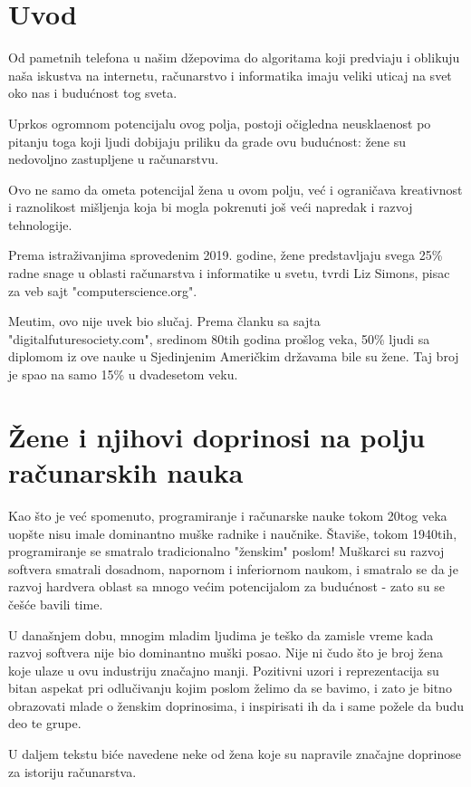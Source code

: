 \documentclass[12pt]{article}
\begin{document}

\tableofcontents

\newpage

\section{Uvod}
\begin{text}
Od pametnih telefona u našim džepovima do algoritama koji predvi\dj aju i oblikuju naša iskustva na internetu, 
računarstvo i informatika imaju veliki uticaj na svet oko nas i budućnost tog sveta.

Uprkos ogromnom potencijalu ovog polja, postoji očigledna neuskla\dj enost po pitanju toga koji ljudi dobijaju priliku da grade ovu budućnost: žene su nedovoljno zastupljene u računarstvu.

Ovo ne samo da ometa potencijal žena u ovom polju, već i ograničava kreativnost i raznolikost mišljenja koja bi mogla pokrenuti još veći napredak i razvoj tehnologije.

Prema istraživanjima sprovedenim 2019. godine, žene predstavljaju svega 25\% radne snage u oblasti računarstva i informatike u svetu, tvrdi Liz Simons, pisac za veb sajt "computerscience.org".

Me\dj utim, ovo nije uvek bio slučaj. Prema članku sa sajta "digitalfuturesociety.com", sredinom 80tih godina prošlog veka, 50\% ljudi sa diplomom iz ove nauke u Sjedinjenim Američkim državama bile su žene. Taj broj je spao na samo 15\% u dvadesetom veku.
\end{text}

\newpage

\section{Žene i njihovi doprinosi na polju računarskih nauka}
\begin{text}
Kao što je već spomenuto, programiranje i računarske nauke tokom 20tog veka uopšte nisu imale dominantno muške radnike i naučnike. Štaviše, tokom 1940tih, programiranje se smatralo tradicionalno "ženskim" poslom! Muškarci su razvoj softvera smatrali dosadnom, napornom i inferiornom naukom, i smatralo se da je razvoj hardvera oblast sa mnogo većim potencijalom za budućnost - zato su se češće bavili time.

U današnjem dobu, mnogim mladim ljudima je teško da zamisle vreme kada razvoj softvera nije bio dominantno muški posao. Nije ni čudo što je broj žena koje ulaze u ovu industriju značajno manji. Pozitivni uzori i reprezentacija su bitan aspekat pri odlučivanju kojim poslom želimo da se bavimo, i zato je bitno obrazovati mlade o ženskim doprinosima, i inspirisati ih da i same požele da budu deo te grupe. 

U daljem tekstu biće navedene neke od žena koje su napravile značajne doprinose za istoriju računarstva.
\end{text}
\end{document}
